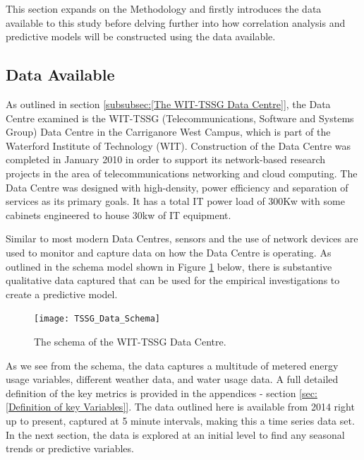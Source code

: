 \documentclass[12pt]{scrartcl}
\begin{document}
\label{sec:[Research Methods]}

This section expands on the Methodology and firstly introduces the data available to this study before delving further into how correlation analysis and predictive models will be constructed using the data available.

 

\subsection{Data Available}

\label{subsec:[Data Available]}

As outlined in section \ref{subsubsec:[The WIT-TSSG Data Centre]}, the Data Centre examined is the WIT-TSSG (Telecommunications, Software and Systems Group) Data Centre in the Carriganore West Campus, which is part of the Waterford Institute of Technology (WIT). Construction of the Data Centre was completed in January 2010 in order to support its network-based research projects in the area of telecommunications networking and cloud computing. The Data Centre was designed with high-density, power efficiency and separation of services as its primary goals. It has a total IT power load of 300Kw with some cabinets engineered to house 30kw of IT equipment.

 

Similar to most modern Data Centres, sensors and the use of network devices are used to monitor and capture data on how the Data Centre is operating. As outlined in the schema model shown in Figure \ref{fig:TSSGdataschema} below, there is substantive qualitative data captured that can be used for the empirical investigations to create a predictive model. 

 

\begin{figure}[H]

  \caption{The schema of the WIT-TSSG Data Centre.}

  \label{fig:TSSGdataschema}

  \centering

    \texttt{[image: TSSG\_Data\_Schema]}

\end{figure}

 

As we see from the schema, the data captures a multitude of metered energy usage variables, different weather data, and water usage data. A full detailed definition of the key metrics is provided in the appendices - section \ref{sec:[Definition of key Variables]}. The data outlined here is available from 2014 right up to present, captured at 5 minute intervals, making this a time series data set. In the next section, the data is explored at an initial level to find any seasonal trends or predictive variables.
 
\end{document}
